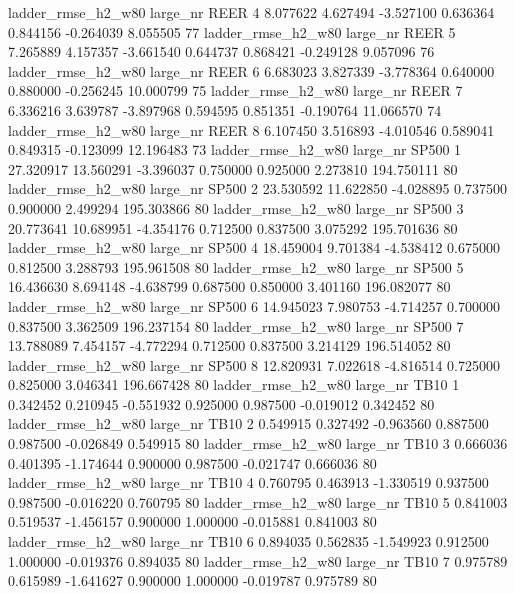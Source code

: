  ladder_rmse_h2_w80   large_nr     REER                 4  8.077622  4.627494  -3.527100 0.636364 0.844156 -0.264039    8.055505 77
 ladder_rmse_h2_w80   large_nr     REER                 5  7.265889  4.157357  -3.661540 0.644737 0.868421 -0.249128    9.057096 76
 ladder_rmse_h2_w80   large_nr     REER                 6  6.683023  3.827339  -3.778364 0.640000 0.880000 -0.256245   10.000799 75
 ladder_rmse_h2_w80   large_nr     REER                 7  6.336216  3.639787  -3.897968 0.594595 0.851351 -0.190764   11.066570 74
 ladder_rmse_h2_w80   large_nr     REER                 8  6.107450  3.516893  -4.010546 0.589041 0.849315 -0.123099   12.196483 73
 ladder_rmse_h2_w80   large_nr    SP500                 1 27.320917 13.560291  -3.396037 0.750000 0.925000  2.273810  194.750111 80
 ladder_rmse_h2_w80   large_nr    SP500                 2 23.530592 11.622850  -4.028895 0.737500 0.900000  2.499294  195.303866 80
 ladder_rmse_h2_w80   large_nr    SP500                 3 20.773641 10.689951  -4.354176 0.712500 0.837500  3.075292  195.701636 80
 ladder_rmse_h2_w80   large_nr    SP500                 4 18.459004  9.701384  -4.538412 0.675000 0.812500  3.288793  195.961508 80
 ladder_rmse_h2_w80   large_nr    SP500                 5 16.436630  8.694148  -4.638799 0.687500 0.850000  3.401160  196.082077 80
 ladder_rmse_h2_w80   large_nr    SP500                 6 14.945023  7.980753  -4.714257 0.700000 0.837500  3.362509  196.237154 80
 ladder_rmse_h2_w80   large_nr    SP500                 7 13.788089  7.454157  -4.772294 0.712500 0.837500  3.214129  196.514052 80
 ladder_rmse_h2_w80   large_nr    SP500                 8 12.820931  7.022618  -4.816514 0.725000 0.825000  3.046341  196.667428 80
 ladder_rmse_h2_w80   large_nr     TB10                 1  0.342452  0.210945  -0.551932 0.925000 0.987500 -0.019012    0.342452 80
 ladder_rmse_h2_w80   large_nr     TB10                 2  0.549915  0.327492  -0.963560 0.887500 0.987500 -0.026849    0.549915 80
 ladder_rmse_h2_w80   large_nr     TB10                 3  0.666036  0.401395  -1.174644 0.900000 0.987500 -0.021747    0.666036 80
 ladder_rmse_h2_w80   large_nr     TB10                 4  0.760795  0.463913  -1.330519 0.937500 0.987500 -0.016220    0.760795 80
 ladder_rmse_h2_w80   large_nr     TB10                 5  0.841003  0.519537  -1.456157 0.900000 1.000000 -0.015881    0.841003 80
 ladder_rmse_h2_w80   large_nr     TB10                 6  0.894035  0.562835  -1.549923 0.912500 1.000000 -0.019376    0.894035 80
 ladder_rmse_h2_w80   large_nr     TB10                 7  0.975789  0.615989  -1.641627 0.900000 1.000000 -0.019787    0.975789 80

